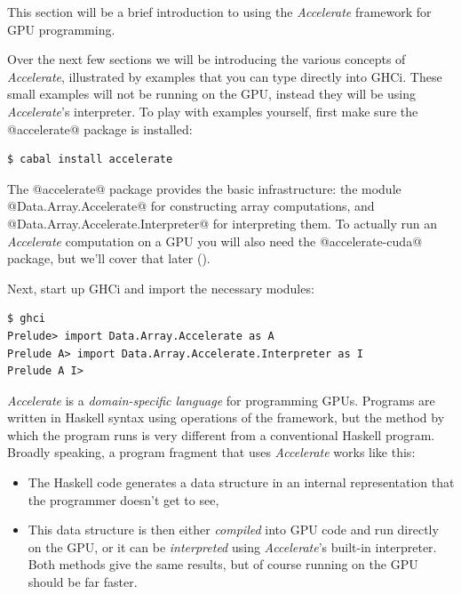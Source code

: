 
\newcommand{\acc}{\textit{Accelerate}}

This section will be a brief introduction to using the
\acc{} framework for GPU programming.

Over the next few sections we will be introducing the various concepts
of \acc, illustrated by examples that you can type directly into GHCi.
These small examples will not be running on the GPU, instead they will
be using \acc's interpreter.  To play with examples yourself, first
make sure the @accelerate@ package is installed:

\begin{verbatim}
$ cabal install accelerate
\end{verbatim}

\noindent The @accelerate@ package provides the basic infrastructure:
the module @Data.Array.Accelerate@ for constructing array
computations, and @Data.Array.Accelerate.Interpreter@ for interpreting
them.  To actually run an \acc{} computation on a GPU you will also
need the @accelerate-cuda@ package, but we'll cover that later
().

Next, start up GHCi and import the necessary modules:

\begin{verbatim}
$ ghci
Prelude> import Data.Array.Accelerate as A
Prelude A> import Data.Array.Accelerate.Interpreter as I
Prelude A I> 
\end{verbatim}


\acc{} is a \emph{domain-specific language} for programming GPUs.
Programs are written in Haskell syntax using operations of the
framework, but the method by which the program runs is very different
from a conventional Haskell program.  Broadly speaking, a program
fragment that uses \acc{} works like this:

\begin{itemize}
\item The Haskell code generates a data structure in an internal
  representation that the programmer doesn't get to see,
\item This data structure is then either \emph{compiled} into GPU code
  and run directly on the GPU, or it can be \emph{interpreted} using
  \acc's built-in interpreter.  Both methods give the same results,
  but of course running on the GPU should be far faster.
\end{itemize}

